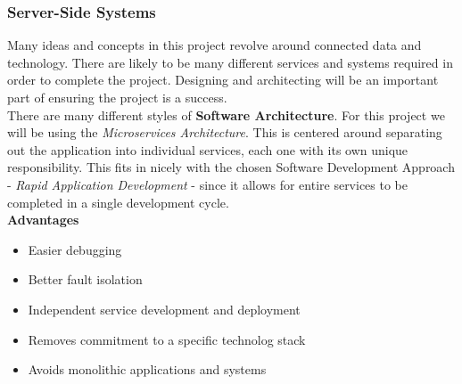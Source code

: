 \subsubsection{Server-Side Systems}
Many ideas and concepts in this project revolve around connected data and technology. There are likely to be many different services and systems required in order to complete the project. Designing and architecting will be an important part of ensuring the project is a success.  \\
There are many different styles of \textbf{Software Architecture}. For this project we will be using the \emph{Microservices Architecture}. This is centered around separating out the application into individual services, each one with its own unique responsibility. This fits in nicely with the chosen Software Development Approach - \emph{Rapid Application Development} - since it allows for entire services to be completed in a single development cycle.\\

    \textbf{Advantages}
    \begin{itemize}
      \item Easier debugging
      \item Better fault isolation
      \item Independent service development and deployment
      \item Removes commitment to a specific technolog stack
      \item Avoids monolithic applications and systems
    \end{itemize}

